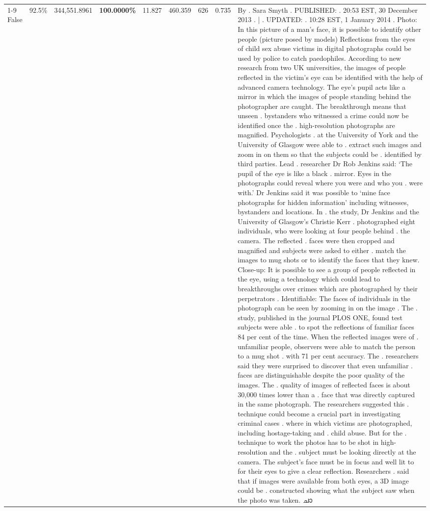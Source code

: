\begin{table}[H]
\begin{tabular}{lllrlllll}
\cline{1-9}
False & 92.5\% & 344,551.8961 & \bfseries \color{red} 100.0000\% & 11.827 & 460.359 & 626 & 0.735 & By . Sara Smyth . PUBLISHED: . 20:53 EST, 30 December 2013 . | . UPDATED: . 10:28 EST, 1 January 2014 . Photo: In this picture of a man's face, it is possible to identify other people (picture posed by models) Reflections from the eyes of child sex abuse victims in digital photographs could be used by police to catch paedophiles. According to new research from two UK universities, the images of people reflected in the victim's eye can be identified with the help of advanced camera technology. The eye's pupil acts like a mirror in which the images of people standing behind the photographer are caught. The breakthrough means that unseen . bystanders who witnessed a crime could now be identified once the . high-resolution photographs are magnified. Psychologists . at the University of York and the University of Glasgow were able to . extract such images and zoom in on them so that the subjects could be . identified by third parties. Lead . researcher Dr Rob Jenkins said: ‘The pupil of the eye is like a black . mirror. Eyes in the photographs could reveal where you were and who you . were with.' Dr Jenkins said it was possible to ‘mine face photographs for hidden information' including witnesses, bystanders and locations. In . the study, Dr Jenkins and the University of Glasgow's Christie Kerr . photographed eight individuals, who were looking at four people behind . the camera. The reflected . faces were then cropped and magnified and subjects were asked to either . match the images to mug shots or to identify the faces that they knew. Close-up: It is possible to see a group of people reflected in the eye, using a technology which could lead to breakthroughs over crimes which are photographed by their perpetrators . Identifiable: The faces of individuals in the photograph can be seen by zooming in on the image . The . study, published in the journal PLOS ONE, found test subjects were able . to spot the reflections of familiar faces 84 per cent of the time. When the reflected images were of . unfamiliar people, observers were able to match the person to a mug shot . with 71 per cent accuracy. The . researchers said they were surprised to discover that even unfamiliar . faces are distinguishable despite the poor quality of the images. The . quality of images of reflected faces is about 30,000 times lower than a . face that was directly captured in the same photograph. The researchers suggested this . technique could become a crucial part in investigating criminal cases . where in which victims are photographed, including hostage-taking and . child abuse. But for the . technique to work the photos has to be shot in high-resolution and the . subject must be looking directly at the camera. The subject's face must be in focus and well lit to for their eyes to give a clear reflection. Researchers . said that if images were available from both eyes, a 3D image could be . constructed showing what the subject saw when the photo was taken. ചാ \\

\end{tabular}
\end{table}
